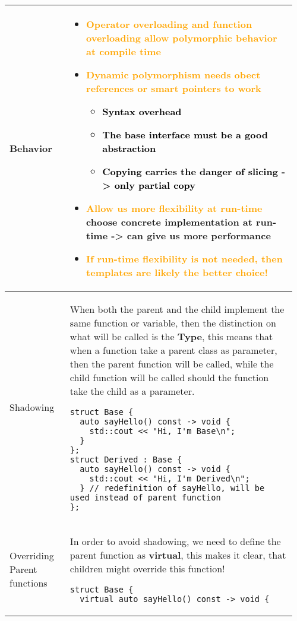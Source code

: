 \documentclass[main.tex,fontsize=8pt,paper=a4,paper=portrait,DIV=calc,]{scrartcl}
\begin{document}
\begin{table}[ht!]
\begin{tabular}{|m{0.2\linewidth}|m{0.755\linewidth}|}
\hline
Behavior & 
\vspace{2mm}
\begin{itemize}
\item \textcolor{orange}{Operator overloading and function overloading allow polymorphic behavior at compile time }
\item \textcolor{orange}{Dynamic polymorphism needs obect references or smart pointers to work}\newline
  \begin{itemize}
  \item \textcolor{black}{Syntax overhead}
  \item \textcolor{black}{The base interface must be a good abstraction}
  \item \textcolor{black}{Copying carries the danger of \textbf{slicing -> only partial copy}}
  \end{itemize} 
\item \textcolor{orange}{Allow us more flexibility at run-time}\newline
  choose concrete implementation at run-time -> can give us more performance
\item \textcolor{orange}{If run-time flexibility is not needed, then templates are likely the better choice!}
\vspace{-3mm}
\end{itemize} 
\\
\hline
Shadowing &
When both the parent and the child implement the same function or variable, then the distinction on what will be called is the \textbf{Type}, this means that when a function take a parent class as parameter, then the parent function will be called, while the child function will be called should the function take the child as a parameter.\newline
\begin{lstlisting}
struct Base {
  auto sayHello() const -> void {
    std::cout << "Hi, I'm Base\n";
  }
};
struct Derived : Base {
  auto sayHello() const -> void {
    std::cout << "Hi, I'm Derived\n";
  } // redefinition of sayHello, will be used instead of parent function
};
\end{lstlisting}
\\
\hline
Overriding Parent functions & 
In order to avoid shadowing, we need to define the parent function as \textbf{virtual}, this makes it clear, that children might override this function!\newline
\begin{lstlisting}
struct Base {
  virtual auto sayHello() const -> void {

\end{lstlisting}
\end{tabular}
\end{table}
\end{document}
